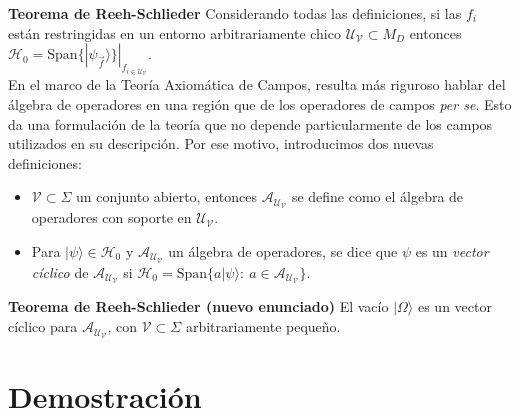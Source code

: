 \textbf{Teorema de Reeh-Schlieder}
Considerando todas las definiciones, si las $f_i$ están restringidas en un entorno arbitrariamente chico $\mathcal{U}_{\mathcal{V}}\subset M_D$ entonces
$\mathcal{H}_0=\text{Span}\{|\psi_{\vec{f}}\rangle\}|_{f_{i\in \mathcal{U}_{\mathcal{V}}}}$.\\

En el marco de la Teoría Axiomática de Campos, resulta más riguroso hablar del álgebra de operadores en una región que de los operadores de campos\textit{ per se}. Esto da una formulación de la teoría que no depende particularmente de los campos utilizados en su descripción\cite{Casini:2019qst}. Por ese motivo, introducimos dos nuevas definiciones:
\begin{itemize}
\item $\mathcal{V}\subset \Sigma$ un conjunto abierto, entonces $\mathcal{A}_{\mathcal{U}_{\mathcal{V}}}$ se define como el álgebra de operadores con soporte en $\mathcal{U}_{\mathcal{V}}$.
\item Para $|\psi\rangle \in \mathcal{H}_0$ y $\mathcal{A}_{\mathcal{U}_{\mathcal{V}}}$ un álgebra de operadores, se dice que $\psi$ es un \textit{vector cíclico} de $\mathcal{A}_{\mathcal{U}_{\mathcal{V}}}$ si $\mathcal{H}_0=\text{Span}\{a|\psi\rangle:\:a\in \mathcal{A}_{{\mathcal{U}_{\mathcal{V}}}}\}$.\\
\end{itemize}
\textbf{Teorema de Reeh-Schlieder (nuevo enunciado)}  El vacío $|\Omega\rangle$ es un vector cíclico para $\mathcal{A}_{\mathcal{U}_{\mathcal{V}}}$, con $\mathcal{V}\subset \Sigma$ arbitrariamente pequeño.  
 
\section{Demostración}
